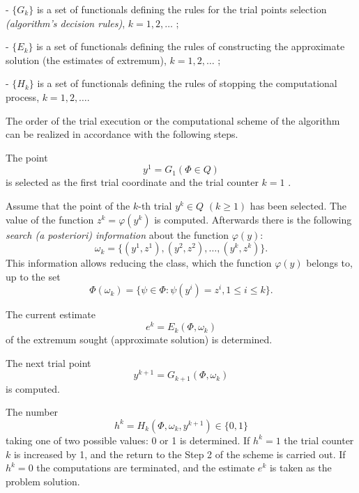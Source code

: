 -  $\{G_k\}$	  is a set of functionals defining the rules for the trial points selection \textit {(algorithm's decision rules)}, $k=1,2,\ldots$ ;

-  $\{E_k\}$	  is a set of functionals defining the rules of constructing the approximate solution (the estimates of extremum), $k=1,2,\ldots$ ;

-  $\{H_k\}$	  is a set of functionals defining the rules of stopping the computational process,  $k=1,2,\ldots$.

The order of the trial execution or the computational scheme of the algorithm   can be realized in accordance with the following steps.

\begin{description}
\item[\textbf{Step 1}]{The point 
\begin{equation}
\label{eq:1_12}
y^1=G_1(\Phi\in Q)
\end{equation}
is selected as the first trial coordinate and the trial counter $k=1$ .}
\item[\textbf{Step 2}]{Assume that the point of the $k$-th trial $y^k\in Q$  $(k\geq 1)$ has been selected. The value of the function $z^k=\varphi(y^k)$  is computed. Afterwards there is the following \textit {search (a posteriori) information} about the function $\varphi(y)$:
\begin{equation}
\label{eq:1_13}
\omega_k=\{(y^1,z^1),(y^2,z^2),\ldots ,(y^k,z^k)\}.
\end{equation}
This information allows reducing the class, which the function  $\varphi(y)$ belongs to, up to the set
\begin{equation}
\label{eq:1_14}
\Phi(\omega_k)=\{\psi\in\Phi:\psi(y^i)=z^i,1\leq i \leq k\}.
\end{equation}
}
\item[\textbf{Step 3}]{The current estimate 
\begin{equation}
\label{eq:1_15}
e^k=E_k(\Phi,\omega_k)
\end{equation}
of the extremum sought (approximate solution) is determined.}
\item[\textbf{Step 4}]{The next trial point 
\begin{equation}
\label{eq:1_16}
y^{k+1}=G_{k+1}(\Phi,\omega_k)
\end{equation}
is computed.}
\item[\textbf{Step 5}]{The number 
\begin{equation}
\label{eq:1_17}
h^k=H_k(\Phi,\omega_k,y^{k+1})\in \{0,1\}
\end{equation}
taking one of two possible values: 0 or 1 is determined. If $h^k=1$ the trial counter $k$ is increased by 1, and the return to the Step 2 of the scheme is carried out. If $h^k=0$ the computations are terminated, and the estimate $e^k$  is taken as the problem solution.}
\end{description}

